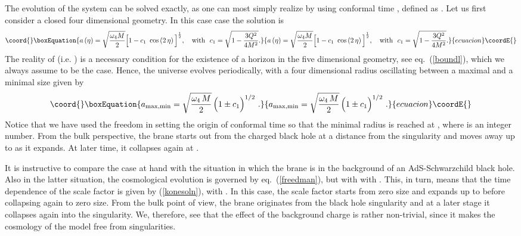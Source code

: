 \documentclass[a4paper,11pt]{article}
\begin{document}
The evolution of the system can be solved exactly, as one can most simply
realize by using conformal time  \myHighlight{$\eta\,$}\coordHE{}, defined as \coordHE{}. Let us first consider a closed four dimensional  geometry. In
this case case the solution is
%
\begin{equation}\coord{}\boxEquation{
a \left( \eta \right) = \sqrt{\omega_4 M\over 2} \Big[ 1 - c_1 ~\cos \left( 2 \, \eta \right) \Big]^{1\over 2},
~~~{\rm with}~~ c_1 = \sqrt{1 - {3 Q^2\over{4 M^2}}}.
\label{konesoln}
}{
a \left( \eta \right) = \sqrt{\omega_4 M\over 2} \Big[ 1 - c_1 ~\cos \left( 2 \, \eta \right) \Big]^{1\over 2},
~~~{\rm with}~~ c_1 = \sqrt{1 - {3 Q^2\over{4 M^2}}}.
}{ecuacion}\coordE{}\end{equation}
%
The reality of \coordHE{} (i.e. \coordHE{}) is a necessary condition
for the existence of a horizon in the five dimensional geometry, see
eq.~(\ref{boundl}), which we always assume to be the case. Hence, the
universe evolves periodically, with a four dimensional radius oscillating
between a maximal and a minimal size given by
%
\begin{equation}\coord{}\boxEquation{
a_{\rm max,min} = 
\sqrt{\frac{\omega_4 \, M}{2}} \, \Big( 1 \pm c_1 \Big)^{1/2} \,\,.
\label{minmax}
}{
a_{\rm max,min} = 
\sqrt{\frac{\omega_4 \, M}{2}} \, \Big( 1 \pm c_1 \Big)^{1/2} \,\,.
}{ecuacion}\coordE{}\end{equation}
%
Notice that we have used the freedom in setting the origin of conformal
time so that the minimal radius is reached at \coordHE{}, where
\coordHE{} is an integer number. From the bulk perspective, the brane  starts out
from the charged black hole at a distance \coordHE{} from the 
singularity  and moves away up to \coordHE{} as it  expands. At later
time, it collapses again at \coordHE{}.

It is instructive to compare the case at hand with the situation in which
the brane is in the background of an AdS-Schwarzchild black hole. Also in
the latter situation, the cosmological evolution is governed by
eq.~(\ref{freedman}), but with with \coordHE{}. This, in turn, means that the
time dependence of the scale factor is given by (\ref{konesoln}), with 
\coordHE{}. In this case, the scale factor starts from zero size 
and expands up to \coordHE{} before collapsing again to zero
size. From the bulk point of view, the brane originates from
the black hole singularity and at a later stage it collapses again into the
singularity. We, therefore, see that the effect of the background charge
\coordHE{} is rather non-trivial, since it makes the cosmology of the model free
from singularities.
\end{document}
